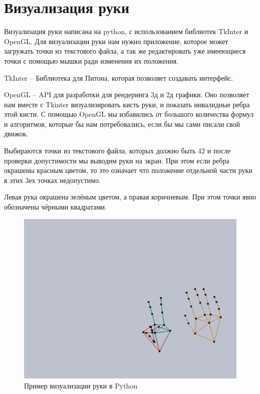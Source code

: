 \section{Визуализация руки}

\hspace{0.6cm} Визуализация руки написана на python, с использованием библиотек TkInter и OpenGL. Для визуализации руки нам нужно приложение, которое может загружать точки из текстового файла, а так же редактировать уже имееющиеся точки с помощью мышки ради изменения их положения.

\hspace{0.6cm} TkInter – Библиотека для Питона, которая позволяет создавать интерфейс.

\hspace{0.6cm} OpenGL – API для разработки для рендеринга 3д и 2д графики. Оно позволяет нам вместе с Tkinter визуализировать кисть руки, и показать инвалидные ребра этой кисти. С помощью OpenGL мы избавились от большого количества формул и алгоритмов, которые бы нам потребовались, если бы мы сами писали свой движок.

\hspace{0.6cm} Выбираются точки из текстового файла, которых должно быть 42 и после проверки допустимости мы выводим руки на экран. При этом если ребра окрашены красным цветом, то это означает что положение отдельной части руки в этих 3ех точках недопустимо.

\hspace{0.6cm} Левая рука окрашена зелёным цветом, а правая коричневым. При этом точки явно обозначены чёрными квадратами.
	
\begin{figure}[ht!]
	\centering
	\includegraphics[scale=0.5]{example.png}
	\caption{Пример визуализации руки в Python}
	\label{fig:VisHand}
\end{figure}